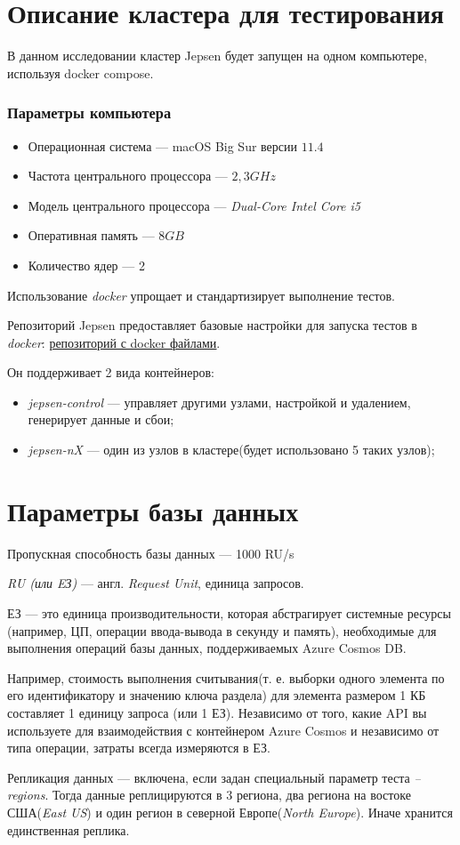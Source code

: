 \documentclass[14pt,  openany]{book}
\begin{document}
\section{Описание кластера для тестирования}
В данном исследовании кластер Jepsen будет запущен на одном компьютере, используя docker compose. 
\subsubsection{Параметры компьютера}
\begin{itemize}
\item Операционная система --- macOS Big Sur версии $11.4$
\item Частота центрального процессора --- $2,3 GHz$
\item Модель центрального процессора --- \textit{Dual-Core Intel Core i5}
\item Оперативная память --- $8 GB$
\item Количество ядер --- 2
\end{itemize}
Использование \textit{docker} упрощает и стандартизирует выполнение тестов. 
\par Репозиторий Jepsen предоставляет базовые настройки для запуска тестов в \textit{docker}: \underline{\href{https://github.com/jepsen-io/jepsen/tree/main/docker}{репозиторий с docker файлами}}.
\par Он поддерживает 2 вида контейнеров:  
\begin{itemize}
\item \textit{jepsen-control} --- управляет другими узлами, настройкой и удалением, генерирует данные и сбои;
\item \textit{jepsen-nX} --- один из узлов в кластере(будет использовано 5 таких узлов);
\end{itemize}

\section{Параметры базы данных}
Пропускная способность базы данных --- 1000 RU/s
\par \textit{RU (или EЗ)} --- англ. \textit{Request Unit},  единица запросов. 
\par ЕЗ — это единица производительности, которая абстрагирует системные ресурсы (например, ЦП, операции ввода-вывода в секунду и память), необходимые для выполнения операций базы данных, поддерживаемых Azure Cosmos DB.
\par Например, стоимость выполнения считывания(т. е. выборки одного элемента по его идентификатору и значению ключа раздела) для элемента размером 1 КБ составляет 1 единицу запроса (или 1 ЕЗ). Независимо от того, какие API вы используете для взаимодействия с контейнером Azure Cosmos и независимо от типа операции, затраты всегда измеряются в ЕЗ. 
\par Репликация данных --- включена, если задан специальный параметр теста \textit{--regions}. Тогда данные реплицируются в 3 региона, два региона на востоке США(\textit{East US}) и один регион в северной Европе(\textit{North Europe}).  Иначе хранится единственная реплика. 
\end{document}

